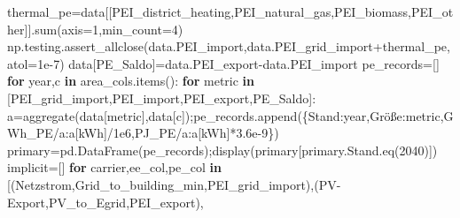 \documentclass[
  ngerman,
  a4paper,
  DIV=11]{scrreprt}
\newenvironment{Shaded}{\begin{snugshade}}{\end{snugshade}}
\newcommand{\BuiltInTok}[1]{\textcolor[rgb]{0.00,0.23,0.31}{#1}}
\newcommand{\ControlFlowTok}[1]{\textcolor[rgb]{0.00,0.23,0.31}{\textbf{#1}}}
\newcommand{\DecValTok}[1]{\textcolor[rgb]{0.68,0.00,0.00}{#1}}
\newcommand{\FloatTok}[1]{\textcolor[rgb]{0.68,0.00,0.00}{#1}}
\newcommand{\KeywordTok}[1]{\textcolor[rgb]{0.00,0.23,0.31}{\textbf{#1}}}
\newcommand{\NormalTok}[1]{\textcolor[rgb]{0.00,0.23,0.31}{#1}}
\newcommand{\OperatorTok}[1]{\textcolor[rgb]{0.37,0.37,0.37}{#1}}
\newcommand{\StringTok}[1]{\textcolor[rgb]{0.13,0.47,0.30}{#1}}
\begin{document}
\begin{Shaded}
\begin{Highlighting}[]
\NormalTok{thermal\_pe}\OperatorTok{=}\NormalTok{data[[}\StringTok{\textquotesingle{}PEI\_district\_heating\textquotesingle{}}\NormalTok{,}\StringTok{\textquotesingle{}PEI\_natural\_gas\textquotesingle{}}\NormalTok{,}\StringTok{\textquotesingle{}PEI\_biomass\textquotesingle{}}\NormalTok{,}\StringTok{\textquotesingle{}PEI\_other\textquotesingle{}}\NormalTok{]].}\BuiltInTok{sum}\NormalTok{(axis}\OperatorTok{=}\DecValTok{1}\NormalTok{,min\_count}\OperatorTok{=}\DecValTok{4}\NormalTok{)}
\NormalTok{np.testing.assert\_allclose(data.PEI\_import,data.PEI\_grid\_import}\OperatorTok{+}\NormalTok{thermal\_pe,atol}\OperatorTok{=}\FloatTok{1e{-}7}\NormalTok{)}
\NormalTok{data[}\StringTok{\textquotesingle{}PE\_Saldo\textquotesingle{}}\NormalTok{]}\OperatorTok{=}\NormalTok{data.PEI\_export}\OperatorTok{{-}}\NormalTok{data.PEI\_import}
\NormalTok{pe\_records}\OperatorTok{=}\NormalTok{[]}
\ControlFlowTok{for}\NormalTok{ year,c }\KeywordTok{in}\NormalTok{ area\_cols.items():}
    \ControlFlowTok{for}\NormalTok{ metric }\KeywordTok{in}\NormalTok{ [}\StringTok{\textquotesingle{}PEI\_grid\_import\textquotesingle{}}\NormalTok{,}\StringTok{\textquotesingle{}PEI\_import\textquotesingle{}}\NormalTok{,}\StringTok{\textquotesingle{}PEI\_export\textquotesingle{}}\NormalTok{,}\StringTok{\textquotesingle{}PE\_Saldo\textquotesingle{}}\NormalTok{]:}
\NormalTok{        a}\OperatorTok{=}\NormalTok{aggregate(data[metric],data[c])}\OperatorTok{;}\NormalTok{pe\_records.append(\{}\StringTok{\textquotesingle{}Stand\textquotesingle{}}\NormalTok{:year,}\StringTok{\textquotesingle{}Größe\textquotesingle{}}\NormalTok{:metric,}\StringTok{\textquotesingle{}GWh\_PE/a\textquotesingle{}}\NormalTok{:a[}\StringTok{\textquotesingle{}kWh\textquotesingle{}}\NormalTok{]}\OperatorTok{/}\FloatTok{1e6}\NormalTok{,}\StringTok{\textquotesingle{}PJ\_PE/a\textquotesingle{}}\NormalTok{:a[}\StringTok{\textquotesingle{}kWh\textquotesingle{}}\NormalTok{]}\OperatorTok{*}\FloatTok{3.6e{-}9}\NormalTok{\})}
\NormalTok{primary}\OperatorTok{=}\NormalTok{pd.DataFrame(pe\_records)}\OperatorTok{;}\NormalTok{display(primary[primary.Stand.eq(}\StringTok{\textquotesingle{}2040\textquotesingle{}}\NormalTok{)])}
\NormalTok{implicit}\OperatorTok{=}\NormalTok{[]}
\ControlFlowTok{for}\NormalTok{ carrier,ee\_col,pe\_col }\KeywordTok{in}\NormalTok{ [(}\StringTok{\textquotesingle{}Netzstrom\textquotesingle{}}\NormalTok{,}\StringTok{\textquotesingle{}Grid\_to\_building\_min\textquotesingle{}}\NormalTok{,}\StringTok{\textquotesingle{}PEI\_grid\_import\textquotesingle{}}\NormalTok{),(}\StringTok{\textquotesingle{}PV{-}Export\textquotesingle{}}\NormalTok{,}\StringTok{\textquotesingle{}PV\_to\_Egrid\textquotesingle{}}\NormalTok{,}\StringTok{\textquotesingle{}PEI\_export\textquotesingle{}}\NormalTok{),}

\end{Highlighting}
\end{Shaded}
\end{document}
